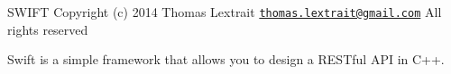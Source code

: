 S\-W\-I\-F\-T Copyright (c) 2014 Thomas Lextrait \href{mailto:thomas.lextrait@gmail.com}{\tt thomas.\-lextrait@gmail.\-com} All rights reserved

Swift is a simple framework that allows you to design a R\-E\-S\-Tful A\-P\-I in C++. 